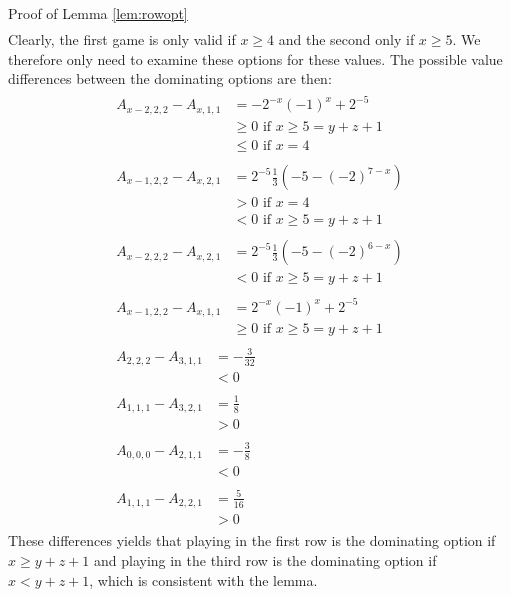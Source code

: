 \begin{proof2}{Proof of Lemma \ref{lem:rowopt}}
\begin{align*}
\end{align*} 
Clearly, the first game is only valid if $x\ge4$ and the second only if $x\ge5$. We therefore only need to examine these options for these values. The possible value differences between the dominating options are then:
\begin{align*}
\begin{split}
A_{x-2,2,2}-A_{x,1,1}&=-2^{-x}(-1)^x+2^{-5}\\
&\ge0\text{ if $x\ge5=y+z+1$}\\
&\le0\text{ if $x=4$}
\end{split}\\
\begin{split}
A_{x-1,2,2}-A_{x,2,1}&=2^{-5}\frac{1}{3}\left(-5-(-2)^{7-x}\right)\\
&>0\text{ if $x=4$}\\
&<0\text{ if $x\ge5=y+z+1$}
\end{split}\\
\begin{split}
A_{x-2,2,2}-A_{x,2,1}&=2^{-5}\frac{1}{3}\left(-5-(-2)^{6-x}\right)\\
&<0\text{ if $x\ge5=y+z+1$}
\end{split}\\
\begin{split}
A_{x-1,2,2}-A_{x,1,1}&=2^{-x}(-1)^x+2^{-5}\\
&\ge0\text{ if $x\ge5=y+z+1$}
\end{split}\\
\begin{split}
A_{2,2,2}-A_{3,1,1}&=-\frac{3}{32}\\
&<0
\end{split}\\
\begin{split}
A_{1,1,1}-A_{3,2,1}&=\frac{1}{8}\\
&>0
\end{split}\\
\begin{split}
A_{0,0,0}-A_{2,1,1}&=-\frac{3}{8}\\
&<0
\end{split}\\
\begin{split}
A_{1,1,1}-A_{2,2,1}&=\frac{5}{16}\\
&>0
\end{split}
\end{align*}
These differences yields that playing in the first row is the dominating option if $x\ge y+z+1$ and playing in the third row is the dominating option if $x<y+z+1$, which is consistent with the lemma.

\end{proof2}
